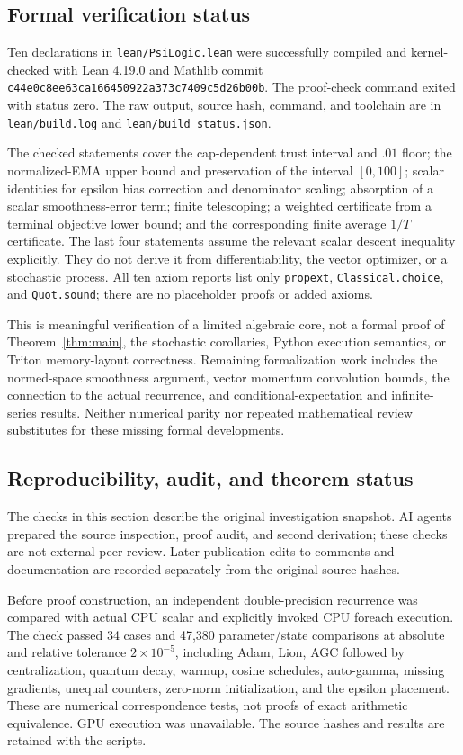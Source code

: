 \documentclass[11pt,a4paper]{article}
\theoremstyle{definition}
\theoremstyle{remark}
\begin{document}
\subsection{Formal verification status}\label{sec:formal}
Ten declarations in \texttt{lean/PsiLogic.lean} were successfully compiled and
kernel-checked with Lean 4.19.0 and Mathlib commit
\texttt{c44e0c8ee63ca166450922a373c7409c5d26b00b}. The proof-check command exited
with status zero. The raw output, source hash, command, and toolchain are in
\texttt{lean/build.log} and \texttt{lean/build\_status.json}.

The checked statements cover the cap-dependent trust interval and $.01$ floor;
the normalized-EMA upper bound and preservation of the interval $[0,100]$;
scalar identities for epsilon bias correction and denominator scaling;
absorption of a scalar smoothness-error term; finite telescoping; a weighted
certificate from a terminal objective lower bound; and the corresponding finite
average $1/T$ certificate. The last four statements assume the relevant scalar
descent inequality explicitly. They do not derive it from differentiability,
the vector optimizer, or a stochastic process. All ten axiom reports list only
\texttt{propext}, \texttt{Classical.choice}, and \texttt{Quot.sound}; there are
no placeholder proofs or added axioms.

This is meaningful verification of a limited algebraic core, not a formal
proof of Theorem~\ref{thm:main}, the stochastic corollaries, Python execution
semantics, or Triton memory-layout correctness. Remaining formalization work
includes the normed-space smoothness argument, vector momentum convolution
bounds, the connection to the actual recurrence, and conditional-expectation
and infinite-series results. Neither numerical parity nor repeated mathematical
review substitutes for these missing formal developments.

\subsection{Reproducibility, audit, and theorem status}\label{sec:audit}
The checks in this section describe the original investigation snapshot.
AI agents prepared the source inspection, proof audit, and second derivation;
these checks are not external peer review. Later publication edits to comments
and documentation are recorded separately from the original source hashes.

Before proof construction, an independent double-precision recurrence was
compared with actual CPU scalar and explicitly invoked CPU foreach execution.
The check passed 34 cases and 47,380 parameter/state comparisons at absolute
and relative tolerance $2\times10^{-5}$, including Adam, Lion, AGC followed by
centralization, quantum decay, warmup, cosine schedules, auto-gamma, missing
gradients, unequal counters, zero-norm initialization, and the epsilon
placement. These are numerical correspondence tests, not proofs of exact
arithmetic equivalence. GPU execution was unavailable. The source hashes and
results are retained with the scripts.
\end{document}
